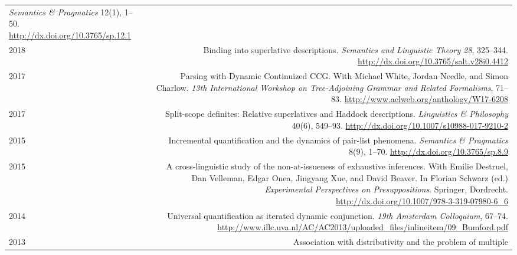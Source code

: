 \documentclass[12pt]{article}
\newcommand{\doi}[1]{\url{http://dx.doi.org/#1}}
\begin{document}
\begin{longtable}{LR}
          \textit{Semantics \& Pragmatics} 12(1), 1--50.\newline
          \doi{10.3765/sp.12.1}\\
  2018  & Binding into superlative descriptions.\newline
          \textit{Semantics and Linguistic Theory 28}, 325--344.\newline
          \doi{10.3765/salt.v28i0.4412}\\
  2017  & Parsing with Dynamic Continuized CCG.\newline
          With Michael White, Jordan Needle, and Simon Charlow.\newline
          \textit{13th International Workshop on Tree-Adjoining Grammar and
          Related Formalisms}, 71--83.\newline
          \url{http://www.aclweb.org/anthology/W17-6208}\\
  2017  & Split-scope definites: Relative superlatives and Haddock
          descriptions.\newline
          \textit{Linguistics \& Philosophy} 40(6), 549--93.\newline
          \doi{10.1007/s10988-017-9210-2}\\
  2015  & Incremental quantification and the dynamics of pair-list phenomena.\newline
          \textit{Semantics \& Pragmatics} 8(9), 1--70.\newline
          \doi{10.3765/sp.8.9}\\
  2015  & A cross-linguistic study of the non-at-issueness of exhaustive
          inferences.\newline
          With Emilie Destruel, Dan Velleman, Edgar Onea, Jingyang Xue, and
          David Beaver.\newline
          In Florian Schwarz (ed.) \textit{Experimental Perspectives on
          Presuppositions}. Springer, Dordrecht.\newline
          \doi{10.1007/978-3-319-07980-6_6}\\ %
  2014  & Universal quantification as iterated dynamic conjunction.\newline
          \textit{19th Amsterdam Colloquium}, 67--74.\newline
          \url{http://www.illc.uva.nl/AC/AC2013/uploaded_files/inlineitem/09_Bumford.pdf}\\
  2013  & Association with distributivity and the problem of multiple

\end{longtable}
\end{document}
